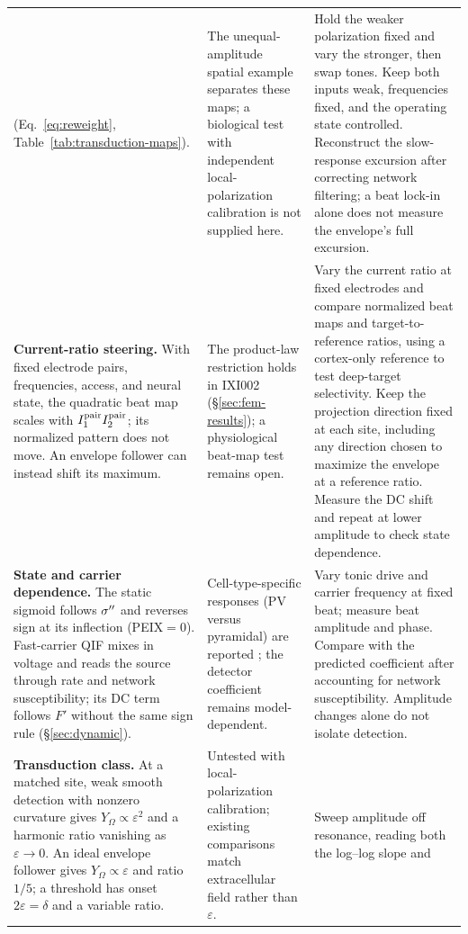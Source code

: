 \begin{longtable}{@{}>{\raggedright\arraybackslash}p{}
 >{\raggedright\arraybackslash}p{}
 >{\raggedright\arraybackslash}p{}@{}}
(Eq.~\eqref{eq:reweight}, Table~\ref{tab:transduction-maps}).
& The unequal-amplitude spatial example separates these maps; a biological test
with independent local-polarization calibration is not supplied here.
& Hold the weaker polarization fixed and vary the stronger, then swap tones.
Keep both inputs weak, frequencies fixed, and the operating state controlled.
Reconstruct the slow-response excursion after correcting network filtering;
a beat lock-in alone does not measure the envelope's full excursion. \\[4pt]
\textbf{Current-ratio steering.} With fixed electrode pairs, frequencies,
access, and neural state, the quadratic beat map scales with
$I_1^{\rm pair}I_2^{\rm pair}$; its normalized pattern does not move.
An envelope follower can instead shift its maximum.
& The product-law restriction \cite{cassara2025part2} holds in IXI002
(\S\ref{sec:fem-results}); a physiological beat-map test remains open.
& Vary the current ratio at fixed electrodes and compare normalized beat maps
and target-to-reference ratios, using a cortex-only reference to test deep-target
selectivity. Keep the projection direction fixed at each site,
including any direction chosen to maximize the envelope at a reference ratio.
Measure the DC shift and repeat at lower amplitude to check state dependence.
 \\[4pt]
\textbf{State and carrier dependence.} The static sigmoid follows $\sigma''$ and
reverses sign at its inflection (PEIX$=0$). Fast-carrier QIF mixes in voltage and
reads the source through rate and network susceptibility; its DC term follows
$F'$ without the same sign rule (\S\ref{sec:dynamic}).
& Cell-type-specific responses (PV versus pyramidal) are reported
\cite{caldas2024}; the detector coefficient remains model-dependent.
& Vary tonic drive and carrier frequency at fixed beat; measure beat amplitude
and phase. Compare with the predicted coefficient after accounting for network
susceptibility. Amplitude changes alone do not isolate detection. \\[4pt]
\textbf{Transduction class.} At a matched site, weak smooth detection with nonzero
curvature gives $Y_\Omega\propto\varepsilon^2$ and a harmonic ratio vanishing as
$\varepsilon\to0$. An ideal envelope follower gives $Y_\Omega\propto\varepsilon$
and ratio $1/5$; a threshold has onset $2\varepsilon=\delta$ and a variable ratio.
& Untested with local-polarization calibration; existing comparisons match
extracellular field rather than $\varepsilon$.
& Sweep amplitude off resonance, reading both the log--log slope and

\end{longtable}
